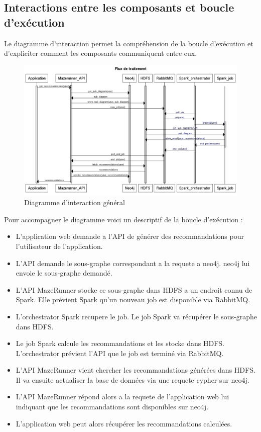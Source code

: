 \subsection{Interactions entre les composants et boucle d'exécution}

Le diagramme d'interaction permet la compréhension de la boucle d'exécution et d'expliciter comment les composants communiquent entre eux.

\begin{figure}
    \centering
    \includegraphics[scale=0.7]{pics/diagramme_interaction.png}
    \caption{Diagramme d'interaction général}
\end{figure}

Pour accompagner le diagramme voici un descriptif de la boucle d'exécution :
\begin{itemize}
  \item L'application web demande a l'API de générer des recommandations pour l'utilisateur de l'application.
  \item L'API demande le sous-graphe correspondant a la requete a neo4j. neo4j lui envoie le sous-graphe demandé.
  \item L'API MazeRunner stocke ce sous-graphe dans HDFS a un endroit connu de Spark. Elle prévient Spark qu'un nouveau job est disponible via RabbitMQ.
  \item L'orchestrator Spark recupere le job. Le job Spark va récupérer le sous-graphe dans HDFS.
  \item Le job Spark calcule les recommandations et les stocke dans HDFS. L'orchestrator prévient l'API que le job est terminé via RabbitMQ.
  \item L'API MazeRunner vient chercher les recommandations générées dans HDFS. Il va ensuite actualiser la base de données via une requete cypher sur neo4j.
  \item L'API MazeRunner répond alors a la requete de l'application web lui indiquant que les recommandations sont disponibles sur neo4j.
  \item L'application web peut alors récupérer les recommandations calculées.
\end{itemize}

